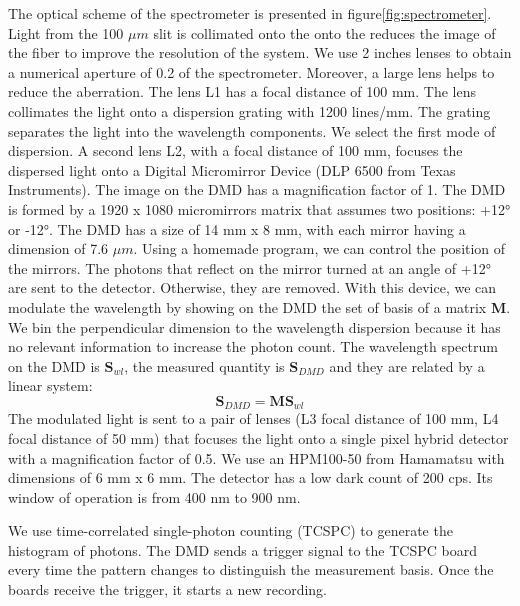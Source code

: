 \documentclass{osa-article}
\begin{document}
The optical scheme of the spectrometer is presented in figure\ref{fig:spectrometer}. Light from the 100 $\mu m$ slit is collimated onto the  onto the reduces the image of the fiber to improve the resolution of the system. We use 2 inches lenses to obtain a numerical aperture of 0.2 of the spectrometer.
Moreover, a large lens helps to reduce the aberration.
The lens L1 has a focal distance of  100 mm. The lens collimates the light onto a dispersion grating with 1200 lines/mm. The grating separates the light into the wavelength components. We select the first mode of dispersion. A second lens L2, with a focal distance of 100 mm, focuses the dispersed light onto a Digital Micromirror Device (DLP 6500 from Texas Instruments). The image on the DMD has a magnification factor of 1.
The DMD is formed by a 1920 x 1080  micromirrors matrix that assumes two positions: +12° or -12°. The DMD has a size of 14 mm x 8 mm, with each mirror having a dimension of 7.6 $\mu m$. Using a homemade program, we can control the position of the mirrors. The photons that reflect on the mirror turned at an angle of +12° are sent to the detector. Otherwise, they are removed. With this device, we can modulate the wavelength by showing on the DMD the set of basis of a matrix \textbf{M}.
We bin the perpendicular dimension to the wavelength dispersion because it has no relevant information to increase the photon count.
The wavelength spectrum on the DMD is $\textbf{S}_{wl}$, the measured quantity is  $\textbf{S}_{DMD}$ and they are related by a linear system:
\begin{equation}
    \textbf{S}_{DMD} = \textbf{M} \textbf{S}_{wl}
    \label{eq:lin_DMD}
\end{equation}
The modulated light is sent to a pair of lenses (L3 focal distance of 100 mm, L4 focal distance of 50 mm) that focuses the light onto a single pixel hybrid detector with a magnification factor of 0.5.
We use an HPM100-50 from Hamamatsu with dimensions of 6 mm x 6 mm.
The detector has a low dark count of 200 cps. Its window of operation is from 400 nm to 900 nm.

We use time-correlated single-photon counting (TCSPC) to generate the histogram of photons. The DMD sends a trigger signal to the TCSPC board every time the pattern changes to distinguish the measurement basis. Once the boards receive the trigger, it starts a new recording.
\end{document}
